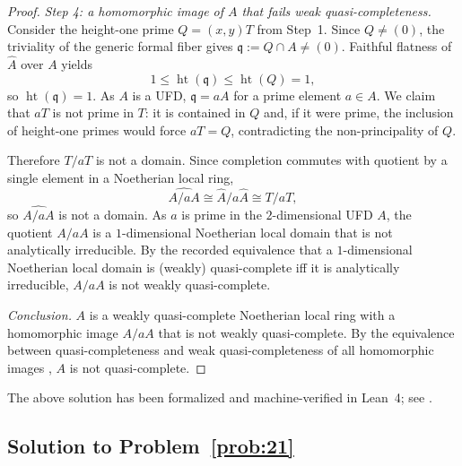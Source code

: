 \documentclass[11pt,reqno]{amsart}
\numberwithin{equation}{section}
\theoremstyle{definition}
\begin{document}
\begin{proof}
\smallskip
\noindent\emph{Step 4: a homomorphic image of $A$ that fails weak
quasi-completeness.} Consider the height-one prime $Q=(x,y)T$ from
Step~1. Since $Q\ne(0)$, the triviality of the generic formal fiber
gives $\mathfrak q:=Q\cap A\ne(0)$. Faithful flatness of $\widehat A$
over $A$ yields
\[
   1\le\operatorname{ht}(\mathfrak q)\le\operatorname{ht}(Q)=1,
\]
so $\operatorname{ht}(\mathfrak q)=1$. As $A$ is a UFD, $\mathfrak q=aA$ for a
prime element $a\in A$. We claim that $aT$ is not prime in $T$: it is
contained in $Q$ and, if it were prime, the inclusion of height-one primes
would force $aT=Q$, contradicting the non-principality of $Q$.

Therefore $T/aT$ is not a domain. Since completion commutes with
quotient by a single element in a Noetherian local ring,
\[
   \widehat{A/aA}\cong\widehat A/a\widehat A\cong T/aT,
\]
so $\widehat{A/aA}$ is not a domain. As $a$ is prime in the
$2$-dimensional UFD $A$, the quotient $A/aA$ is a $1$-dimensional
Noetherian local domain that is not analytically irreducible. By the
recorded equivalence \cite[Corollary~2.2]{Anderson2014-QCRM} that a $1$-dimensional
Noetherian local domain is (weakly) quasi-complete iff it is
analytically irreducible, $A/aA$ is not weakly quasi-complete.

\smallskip
\noindent\emph{Conclusion.} $A$ is a weakly quasi-complete Noetherian
local ring with a homomorphic image $A/aA$ that is not weakly
quasi-complete. By the equivalence between quasi-completeness and
weak quasi-completeness of all homomorphic images
\cite{Anderson2014-QCRM}, $A$ is not quasi-complete.
\end{proof}

\noindent The above solution has been formalized and machine-verified
in Lean~4; see \cite{JuEtAl2026Rethlas}.



\subsection{Solution to Problem~\ref{prob:21}}\label{subsec:proof-21}
\end{document}
